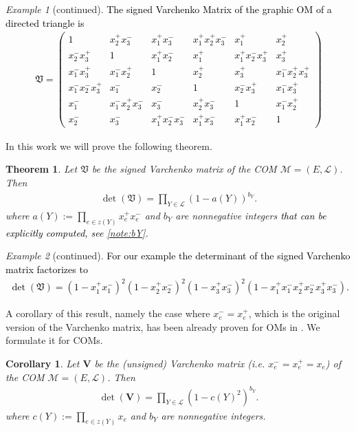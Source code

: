 \documentclass[12pt]{amsart}
\def\Var{{\mathfrak V}}
\def\M{{\mathcal M}}
\theoremstyle{plain}
\numberwithin{Lemma}{\DefaultNumberTheoremWithin}
\numberwithin{Claim}{\DefaultNumberTheoremWithin}
\newtheorem{Theorem}{Theorem}
\numberwithin{Theorem}{\DefaultNumberTheoremWithin}
\newtheorem{Corollary}{Corollary}
\numberwithin{Corollary}{\DefaultNumberTheoremWithin}
\numberwithin{Proposition}{\DefaultNumberTheoremWithin}
\numberwithin{Conjecture}{\DefaultNumberTheoremWithin}
\numberwithin{Situation}{\DefaultNumberTheoremWithin}
\numberwithin{Note}{\DefaultNumberTheoremWithin}
\theoremstyle{definition}
\numberwithin{Definition}{\DefaultNumberTheoremWithin}
\theoremstyle{definition}
\numberwithin{Question}{\DefaultNumberTheoremWithin}
\theoremstyle{definition}
\numberwithin{Problem}{\DefaultNumberTheoremWithin}
\theoremstyle{remark} \newtheorem{Remark}{Remark}
\numberwithin{Remark}{\DefaultNumberTheoremWithin}
\theoremstyle{remark}
\newtheorem{Example}{Example}
\numberwithin{Example}{\DefaultNumberTheoremWithin}
\numberwithin{Case}{Lemma}
\numberwithin{Step}{Lemma}
\newcommand{\new}[1]{\textcolor{black}{#1}}
\begin{document}
\begin{Example}[continued]
\new{The signed Varchenko Matrix of the graphic OM of a directed triangle is
\begin{align*}
\Var = \left(\begin{array}{cccccc}
1&x_2^+ x_3^-&x_1^+ x_3^-&x_1^+ x_2^+ x_3^-&x_1^+&x_2^+\\
x_2^- x_3^+&1&x_1^+ x_2^-&x_1^+&x_1^+ x_2^- x_3^+&x_3^+\\
x_1^- x_3^+&x_1^- x_2^+&1&x_2^+&x_3^+&x_1^- x_2^+ x_3^+\\
x_1^- x_2^- x_3^+&x_1^-&x_2^-&1&x_2^- x_3^+&x_1^- x_3^+\\
x_1^- &x_1^- x_2^+ x_3^-&x_3^-&x_2^+ x_3^-&1&x_1^- x_2^+\\
x_2^-&x_3^-&x_1^+ x_2^- x_3^-&x_1^+ x_3^-&x_1^+ x_2^-&1
\end{array} \right)
\end{align*}}

\end{Example}

In this work we will prove the following theorem.

\begin{Theorem}
   \label{thm:varchenko}
   Let $\Var$ be the signed Varchenko matrix of the COM $\M=(E,\mathcal{L})$.
   Then
   \begin{align*}
     \det (\Var) = \prod_{Y \in \mathcal{L}} (1-a(Y))^{b_Y}. 
   \end{align*}
   where $a(Y) := \prod_{e \in z(Y)} x_{e}^+ x_{e}^-$ and $b_Y$ are nonnegative integers \new{that can be explicitly computed, see  \ref{note:bY}.}
\end{Theorem}


\begin{Example}[continued]
\new{For our example the determinant of the signed Varchenko matrix factorizes to
\begin{align*}
\det (\Var) = (1 - x_1^+ x_1^-)^2 (1 - x_2^+ x_2^-)^2 (1 - x_3^+ x_3^-)^2 (1 - x_1^+ x_1^- x_2^+ x_2^- x_3^+ x_3^-).
\end{align*}}
\end{Example}

A corollary of this result, namely the case where $x_{e}^-=x_{e}^+$, which is the original version of the Varchenko matrix, has been already proven for OMs in \cite{WH}. We formulate it for COMs.

\begin{Corollary}\label{cor:varchenko}
Let $\mathbf{V}$ be the (unsigned) Varchenko matrix (i.e. $x_{e}^-=x_{e}^+=x_e$) of the COM $\M=(E,\mathcal{L})$.
   Then
   \begin{align*}
     \det (\mathbf{V}) = \prod_{Y \in \mathcal{L}} (1-c(Y)^2)^{b_Y}. 
   \end{align*}
   where $c(Y) := \prod_{e \in z(Y)}x_{e}$ and $b_Y$ are nonnegative integers.
\end{Corollary}
\end{document}
